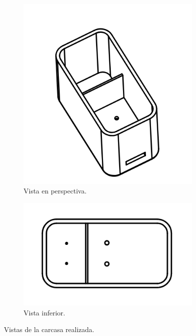 \documentclass[12pt,a4paper,twoside,fleqn]{article}
\begin{document}
\begin{figure}
    \centering
    \begin{subfigure}{.25\textwidth}
        \centering
        \includegraphics[width=\textwidth]{img/carcasa_bosquejo_3d.png}
        \caption{Vista en perspectiva.}
        \label{fig:bosquejo_carcasa}
    \end{subfigure}
    \begin{subfigure}{.25\textwidth}
        \centering
        \includegraphics[width=\textwidth]{img/carcasa_vista_inferior.png}
        \caption{Vista inferior.}
        \label{fig:vista_inf_carcasa}     
    \end{subfigure}
    \caption{Vistas de la carcasa realizada.}
    \label{fig:vistas_carcasa}
\end{figure}
\end{document}

